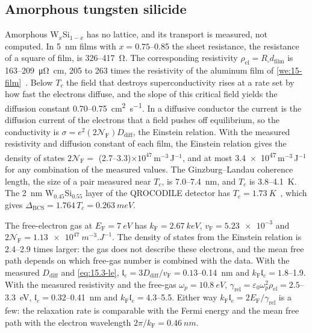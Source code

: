 \subsection{Amorphous tungsten silicide}\label{sec:15.3-wsi}

Amorphous W$_x$Si$_{1-x}$ has no lattice, and its transport is measured, not computed. In \SI{5}{nm} films with $x = 0.75$--0.85 the sheet resistance, the resistance of a square of film, is 326--\SI{417}{\ohm}. The corresponding resistivity $\rho_{\mathrm{el}} = R_\square d_{\mathrm{film}}$ is 163--\SI{209}{\micro\ohm.cm}, 205 to 263 times the resistivity of the aluminum film of \cref{we:15-film}~\cite[Table~I]{zhang2016characteristics}. Below $T_c$ the field that destroys superconductivity rises at a rate set by how fast the electrons diffuse, and the slope of this critical field yields the diffusion constant 0.70--\SI{0.75}{cm^2.s^{-1}}. In a diffusive conductor the current is the diffusion current of the electrons that a field pushes off equilibrium, so the conductivity is $\sigma = e^2(2\mathcal{N}_{\mathrm{F}})D_{\mathrm{diff}}$, the Einstein relation. With the measured resistivity and diffusion constant of each film, the Einstein relation gives the density of states $2\mathcal{N}_{\mathrm{F}} = $ (2.7--3.3)$\times10^{47}$\,m$^{-3}$\,J$^{-1}$, and at most \num{3.4e47}\,m$^{-3}$\,J$^{-1}$ for any combination of the measured values. The Ginzburg--Landau coherence length, the size of a pair measured near $T_c$, is 7.0--\SI{7.4}{nm}, and $T_c$ is 3.8--\SI{4.1}{K}. The \SI{2}{nm} W$_{0.45}$Si$_{0.55}$ layer of the QROCODILE detector has $T_c = \SI{1.73}{K}$~\cite{baudis2025first}, which gives $\Delta_{\mathrm{BCS}} = 1.764\,T_c = \SI{0.263}{meV}$.

The free-electron gas at $E_{\mathrm{F}} = \SI{7}{eV}$ has $k_{\mathrm{F}} = \SI{2.67}{keV}$, $v_{\mathrm{F}} = \num{5.23e-3}$ and $2\mathcal{N}_{\mathrm{F}} = \SI{1.13e47}{m^{-3}.J^{-1}}$. The density of states from the Einstein relation is 2.4--2.9 times larger: the gas does not describe these electrons, and the mean free path depends on which free-gas number is combined with the data. With the measured $D_{\mathrm{diff}}$ and \cref{eq:15.3-le}, $\mathfrak{l}_e = 3D_{\mathrm{diff}}/v_{\mathrm{F}} = 0.13$--\SI{0.14}{nm} and $k_{\mathrm{F}}\mathfrak{l}_e = 1.8$--1.9. With the measured resistivity and the free-gas $\omega_p = \SI{10.8}{eV}$, $\gamma_{\mathrm{rel}} = \varepsilon_0\omega_p^2\rho_{\mathrm{el}} = 2.5$--\SI{3.3}{eV}, $\mathfrak{l}_e = 0.32$--\SI{0.41}{nm} and $k_{\mathrm{F}}\mathfrak{l}_e = 4.3$--5.5. Either way $k_{\mathrm{F}}\mathfrak{l}_e = 2E_{\mathrm{F}}/\gamma_{\mathrm{rel}}$ is a few: the relaxation rate is comparable with the Fermi energy and the mean free path with the electron wavelength $2\pi/k_{\mathrm{F}} = \SI{0.46}{nm}$.

